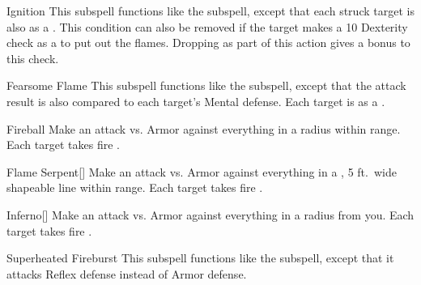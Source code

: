 \begin{ability}[\nth{2}]{Ignition}
This subspell functions like the  subspell, except that each struck target is also  as a .
This condition can also be removed if the target makes a  10 Dexterity check as a  to put out the flames.
Dropping  as part of this action gives a  bonus to this check.
\end{ability}
\vspace{0.25em}



\begin{ability}[\nth{3}]{Fearsome Flame}
This subspell functions like the  subspell, except that the attack result is also compared to each target's Mental defense.
\hit Each target is  as a .
\end{ability}
\vspace{0.25em}



\begin{ability}[\nth{3}]{Fireball}
Make an attack vs. Armor against everything in a \areamed radius within \rngmed range.
\hit Each target takes fire .
\end{ability}
\vspace{0.25em}



\begin{ability}[\nth{3}]{Flame Serpent}[]
Make an attack vs. Armor against everything in a \arealarge, 5 ft.\ wide shapeable line within \rngmed range.
\hit Each target takes fire .
\end{ability}
\vspace{0.25em}



\begin{ability}[\nth{3}]{Inferno}[]
Make an attack vs. Armor against everything in a \arealarge radius from you.
\hit Each target takes fire .
\end{ability}
\vspace{0.25em}



\begin{ability}[\nth{3}]{Superheated Fireburst}
This subspell functions like the  subspell, except that it attacks Reflex defense instead of Armor defense.
\end{ability}
\vspace{0.25em}



